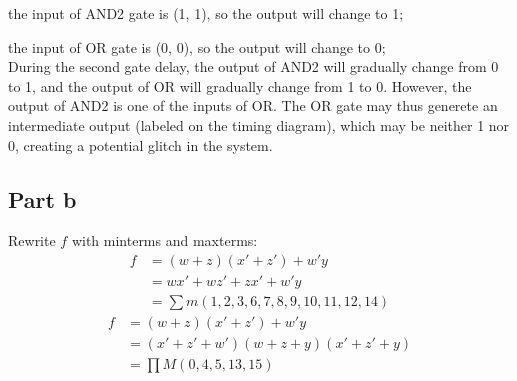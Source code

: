 \documentclass[12pt, a4paper]{article}
\begin{document}
	the input of AND2 gate is (1, 1), so the output will change to 1;
	
	the input of OR gate is (0, 0), so the output will change to 0;
	\\
	
	During the second gate delay, the output of AND2 will gradually change from 0 to 1,
	and the output of OR will gradually change from 1 to 0. However, the output of AND2
	is one of the inputs of OR. The OR gate may thus generete an intermediate output 
	(labeled on the timing diagram), which may be neither 1 nor 0, creating a potential
	glitch in the system.
	
	\subsection*{Part b}
	Rewrite $f$ with minterms and maxterms:
	\begin{align*}
		f &= (w + z)(x' + z') + w'y \\
		&= wx' + wz' + zx' + w'y \\
		&= \sum{m(1,2,3,6,7,8,9,10,11,12,14)}
	\end{align*}
	\begin{align*}
		f &= (w + z)(x' + z') + w'y \\
		&= (x' + z' + w')(w + z + y)(x' + z' + y) \\
		&= \prod{M(0, 4, 5, 13, 15)}
	\end{align*}
	
\end{document}
